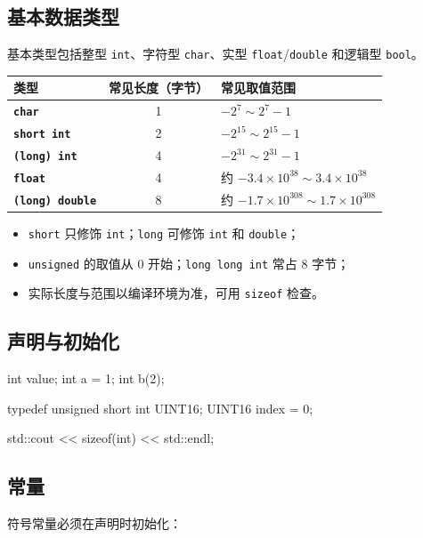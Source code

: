 \documentclass[UTF8,fontset=fandol,zihao=5]{ctexart}
\newcommand{\code}[1]{\texttt{#1}}
\begin{document}
\subsection{基本数据类型}

基本类型包括整型 \code{int}、字符型 \code{char}、实型 \code{float}/\code{double} 和逻辑型 \code{bool}。

\begin{center}
\begin{tabularx}{0.88\textwidth}{>{\bfseries}p{3cm}cX}
\toprule
类型 & 常见长度（字节） & 常见取值范围 \\
\midrule
\code{char} & 1 & $-2^7\sim 2^7-1$ \\
\code{short int} & 2 & $-2^{15}\sim 2^{15}-1$ \\
\code{(long) int} & 4 & $-2^{31}\sim 2^{31}-1$ \\
\code{float} & 4 & 约 $-3.4\times10^{38}\sim 3.4\times10^{38}$ \\
\code{(long) double} & 8 & 约 $-1.7\times10^{308}\sim 1.7\times10^{308}$ \\
\bottomrule
\end{tabularx}
\end{center}

\begin{itemize}
  \item \code{short} 只修饰 \code{int}；\code{long} 可修饰 \code{int} 和 \code{double}；
  \item \code{unsigned} 的取值从 $0$ 开始；\code{long long int} 常占 $8$ 字节；
  \item 实际长度与范围以编译环境为准，可用 \code{sizeof} 检查。
\end{itemize}

\subsection{声明与初始化}

\begin{cppcode}[变量]
int value;
int a = 1;
int b(2);

typedef unsigned short int UINT16;
UINT16 index = 0;

std::cout << sizeof(int) << std::endl;
\end{cppcode}

\subsection{常量}

符号常量必须在声明时初始化：
\end{document}
